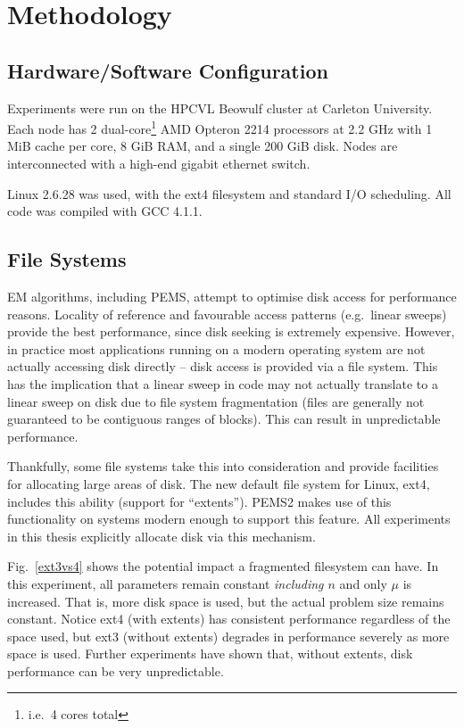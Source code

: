 \documentclass[12pt]{carletoncsthesis}
\begin{document}
\chapter{Methodology}
\thispagestyle{empty}
\label{methodology}


\section{Hardware/Software Configuration}
\label{setup}


Experiments were run on the HPCVL Beowulf cluster at Carleton University.
Each node has 2 dual-core\footnote{i.e.\ 4 cores total} AMD Opteron 2214
processors at 2.2 GHz with 1 MiB cache per core, 8 GiB RAM, and a single 200
GiB disk.  Nodes are interconnected with a high-end gigabit ethernet switch.

Linux 2.6.28 was used, with the ext4 filesystem and standard I/O scheduling.
All code was compiled with GCC 4.1.1.

\section{File Systems}
\label{filesystems}


EM algorithms, including PEMS, attempt to optimise disk access for
performance reasons.  Locality of reference and favourable access patterns
(e.g.\ linear sweeps) provide the best performance, since disk seeking
is extremely expensive.  However, in practice most applications running
on a modern operating system are not actually accessing disk directly --
disk access is provided via a file system.  This has the implication that
a linear sweep in code may not actually translate to a linear sweep on disk
due to file system fragmentation (files are generally not guaranteed to be
contiguous ranges of blocks).  This can result in unpredictable performance.

Thankfully, some file systems take this into consideration and provide
facilities for allocating large areas of disk.  The new default file system
for Linux, ext4, includes this ability (support for ``extents'').  PEMS2 makes
use of this functionality on systems modern enough to support this feature.
All experiments in this thesis explicitly allocate disk via this mechanism.

Fig.~\ref{ext3vs4} shows the potential impact a fragmented filesystem can have.
In this experiment, all parameters remain constant {\em including $n$} and
only $\mu$ is increased.  That is, more disk space is used, but the actual
problem size remains constant.  Notice ext4 (with extents) has consistent
performance regardless of the space used, but ext3 (without extents) degrades
in performance severely as more space is used.  Further experiments have shown
that, without extents, disk performance can be very unpredictable.
\end{document}
